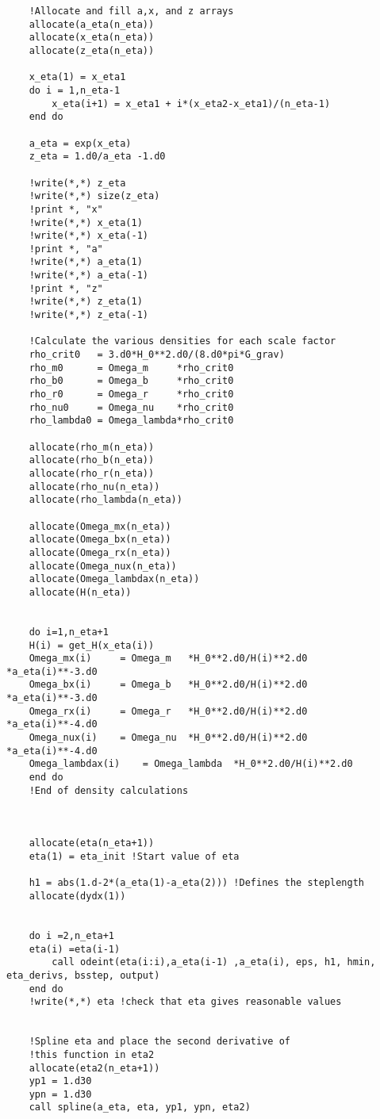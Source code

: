 \documentclass{aa}   %
\begin{document}
\begin{verbatim}
    !Allocate and fill a,x, and z arrays
    allocate(a_eta(n_eta))
    allocate(x_eta(n_eta))
    allocate(z_eta(n_eta))

    x_eta(1) = x_eta1
    do i = 1,n_eta-1
        x_eta(i+1) = x_eta1 + i*(x_eta2-x_eta1)/(n_eta-1)
    end do

    a_eta = exp(x_eta)
    z_eta = 1.d0/a_eta -1.d0

    !write(*,*) z_eta
    !write(*,*) size(z_eta)
    !print *, "x"
    !write(*,*) x_eta(1)
    !write(*,*) x_eta(-1)
    !print *, "a"
    !write(*,*) a_eta(1)
    !write(*,*) a_eta(-1)
    !print *, "z"
    !write(*,*) z_eta(1)
    !write(*,*) z_eta(-1)   

    !Calculate the various densities for each scale factor
    rho_crit0   = 3.d0*H_0**2.d0/(8.d0*pi*G_grav)
    rho_m0  	= Omega_m     *rho_crit0
    rho_b0  	= Omega_b     *rho_crit0
    rho_r0  	= Omega_r     *rho_crit0
    rho_nu0 	= Omega_nu    *rho_crit0
    rho_lambda0 = Omega_lambda*rho_crit0

    allocate(rho_m(n_eta))
    allocate(rho_b(n_eta))
    allocate(rho_r(n_eta))
    allocate(rho_nu(n_eta))
    allocate(rho_lambda(n_eta))

    allocate(Omega_mx(n_eta))
    allocate(Omega_bx(n_eta))
    allocate(Omega_rx(n_eta))
    allocate(Omega_nux(n_eta))
    allocate(Omega_lambdax(n_eta))
    allocate(H(n_eta))


    do i=1,n_eta+1
    H(i) = get_H(x_eta(i))
    Omega_mx(i) 	= Omega_m 	*H_0**2.d0/H(i)**2.d0	*a_eta(i)**-3.d0
    Omega_bx(i) 	= Omega_b 	*H_0**2.d0/H(i)**2.d0	*a_eta(i)**-3.d0
    Omega_rx(i) 	= Omega_r 	*H_0**2.d0/H(i)**2.d0	*a_eta(i)**-4.d0
    Omega_nux(i) 	= Omega_nu 	*H_0**2.d0/H(i)**2.d0	*a_eta(i)**-4.d0
    Omega_lambdax(i) 	= Omega_lambda	*H_0**2.d0/H(i)**2.d0
    end do
    !End of density calculations



    allocate(eta(n_eta+1))
    eta(1) = eta_init !Start value of eta 

    h1 = abs(1.d-2*(a_eta(1)-a_eta(2))) !Defines the steplength
    allocate(dydx(1))


    do i =2,n_eta+1
	eta(i) =eta(i-1)
        call odeint(eta(i:i),a_eta(i-1) ,a_eta(i), eps, h1, hmin, eta_derivs, bsstep, output) 
    end do
    !write(*,*) eta !check that eta gives reasonable values


    !Spline eta and place the second derivative of
    !this function in eta2
    allocate(eta2(n_eta+1))
    yp1 = 1.d30
    ypn = 1.d30
    call spline(a_eta, eta, yp1, ypn, eta2)
    


\end{verbatim}
\end{document}
